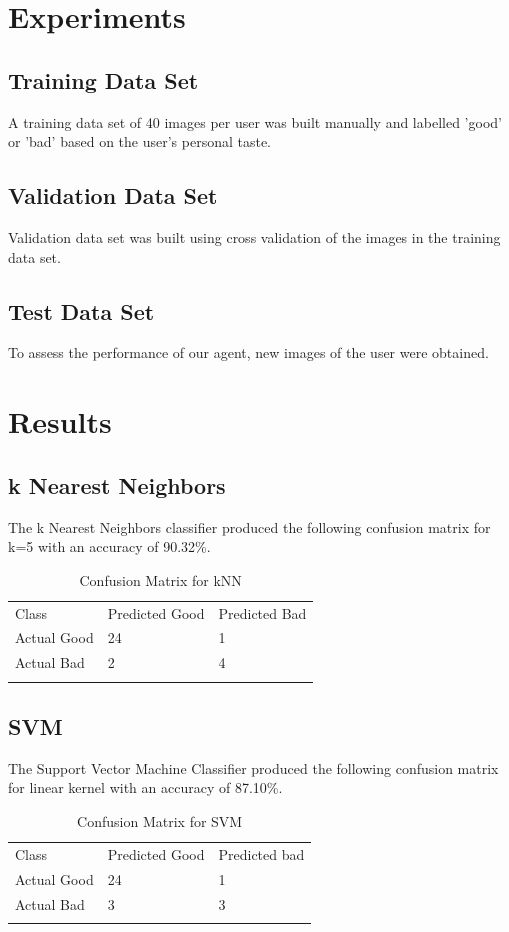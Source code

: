 \section{Experiments}
\subsection{Training Data Set}
A training data set of 40 images per user was built manually and labelled 'good' or 'bad' based on the user's personal taste.
\subsection{Validation Data Set}
Validation data set was built using cross validation of the images in the training data set. 
\subsection{Test Data Set}
To assess the performance of our agent, new images of the user were obtained.



\section{Results} 
\subsection{k Nearest Neighbors}
The k Nearest Neighbors classifier produced the following confusion matrix for k=5 with an accuracy of 90.32\%.
\begin{table}[H]
\caption{Confusion Matrix for kNN}
\label{tab:1}       %
\begin{tabular}{lll}
\hline\noalign{\smallskip}
Class & Predicted Good & Predicted Bad  \\
\noalign{\smallskip}\hline\noalign{\smallskip}
Actual Good & 24 & 1 \\
Actual Bad & 2 & 4 \\
\noalign{\smallskip}\hline
\end{tabular}
\end{table}


\subsection{SVM}
The Support Vector Machine Classifier produced the following confusion matrix for linear kernel with an accuracy of 87.10\%.
\begin{table}[H]
\caption{Confusion Matrix for SVM}
\label{tab:1}       %
\begin{tabular}{lll}
\hline\noalign{\smallskip}
Class & Predicted Good & Predicted bad  \\
\noalign{\smallskip}\hline\noalign{\smallskip}
Actual Good & 24 & 1 \\
Actual Bad & 3 & 3 \\
\noalign{\smallskip}\hline
\end{tabular}
\end{table}

